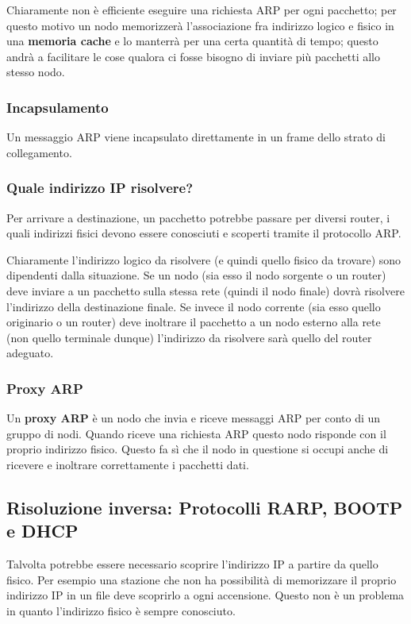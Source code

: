         Chiaramente non è efficiente eseguire una richiesta ARP per ogni pacchetto; per questo motivo un nodo memorizzerà l'associazione fra indirizzo logico e fisico in una \textbf{memoria cache} e lo manterrà per una certa quantità di tempo; questo andrà a facilitare le cose qualora ci fosse bisogno di inviare più pacchetti allo stesso nodo.
        
        \subsubsection{Incapsulamento}
            Un messaggio ARP viene incapsulato direttamente in un frame dello strato di collegamento.
            
        \subsubsection{Quale indirizzo IP risolvere?}
            Per arrivare a destinazione, un pacchetto potrebbe passare per diversi router, i quali indirizzi fisici devono essere conosciuti e scoperti tramite il protocollo ARP.
            
            Chiaramente l'indirizzo logico da risolvere (e quindi quello fisico da trovare) sono dipendenti dalla situazione. Se un nodo (sia esso il nodo sorgente o un router) deve inviare a un pacchetto sulla stessa rete (quindi il nodo finale) dovrà risolvere l'indirizzo della destinazione finale. Se invece il nodo corrente (sia esso quello originario o un router) deve inoltrare il pacchetto a un nodo esterno alla rete (non quello terminale dunque) l'indirizzo da risolvere sarà quello del router adeguato.
            
        \subsubsection{Proxy ARP}
            Un \textbf{proxy ARP} è un nodo che invia e riceve messaggi ARP per conto di un gruppo di nodi. Quando riceve una richiesta ARP questo nodo risponde con il proprio indirizzo fisico. Questo fa sì che il nodo in questione si occupi anche di ricevere e inoltrare correttamente i pacchetti dati.
            
    \subsection{Risoluzione inversa: Protocolli RARP, BOOTP e DHCP}
        Talvolta potrebbe essere necessario scoprire l'indirizzo IP a partire da quello fisico. Per esempio una stazione che non ha possibilità di memorizzare il proprio indirizzo IP in un file deve scoprirlo a ogni accensione. Questo non è un problema in quanto l'indirizzo fisico è sempre conosciuto.
        
